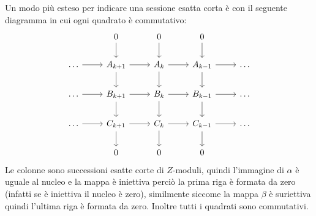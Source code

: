 Un modo più esteso per indicare una sessione esatta corta è con il seguente
diagramma in cui ogni quadrato è commutativo:
\[
  \begin{tikzcd}
    {} & 0 \arrow{d}{} & 0 \arrow{d}{} & 0 \arrow{d}{} & {} \\
    \dots \arrow{r}{} & A_{k+1} \arrow{r}{} \arrow{d}{} & A_{k} \arrow{r}{} \arrow{d}{} & A_{k-1} \arrow{r}{} \arrow{d}{} & \dots \\
    \dots \arrow{r}{} & B_{k+1} \arrow{r}{} \arrow{d}{} & B_{k} \arrow{r}{} \arrow{d}{} & B_{k-1} \arrow{r}{} \arrow{d}{} & \dots \\
    \dots \arrow{r}{} & C_{k+1} \arrow{r}{} \arrow{d}{} & C_{k} \arrow{r}{} \arrow{d}{} & C_{k-1} \arrow{r}{} \arrow{d}{} & \dots \\
    {} & 0 & 0 & 0 & {}
  \end{tikzcd}
\]
Le colonne sono successioni esatte corte di $ Z $-moduli, quindi
l'immagine di $ \alpha $ è uguale al nucleo e la mappa è iniettiva
perciò la prima riga è formata da zero (infatti se è
iniettiva il nucleo è zero), similmente siccome
la mappa $ \beta $ è suriettiva quindi l'ultima
riga è formata da zero.
Inoltre tutti i quadrati sono commutativi.
